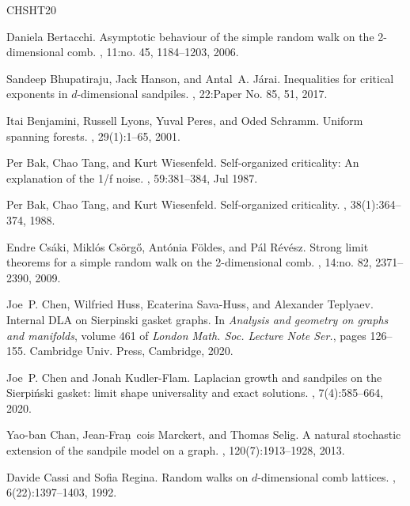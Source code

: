 \documentclass[11pt]{article}
\begin{document}
\begin{thebibliography}{CHSHT20}

Daniela Bertacchi.
\newblock Asymptotic behaviour of the simple random walk on the 2-dimensional comb.
, 11:no. 45, 1184--1203, 2006.

Sandeep Bhupatiraju, Jack Hanson, and Antal~A. J\'arai.
\newblock Inequalities for critical exponents in {$d$}-dimensional sandpiles.
, 22:Paper No. 85, 51, 2017.

Itai Benjamini, Russell Lyons, Yuval Peres, and Oded Schramm.
\newblock Uniform spanning forests.
, 29(1):1--65, 2001.

Per Bak, Chao Tang, and Kurt Wiesenfeld.
\newblock Self-organized criticality: An explanation of the 1/f noise.
, 59:381--384, Jul 1987.

Per Bak, Chao Tang, and Kurt Wiesenfeld.
\newblock Self-organized criticality.
, 38(1):364--374, 1988.

Endre Cs\'aki, Mikl\'os Cs\"org\H{o}, Ant\'onia F\"oldes, and P\'al R\'ev\'esz.
\newblock Strong limit theorems for a simple random walk on the 2-dimensional comb.
, 14:no. 82, 2371--2390, 2009.

Joe~P. Chen, Wilfried Huss, Ecaterina Sava-Huss, and Alexander Teplyaev.
\newblock Internal {DLA} on {S}ierpinski gasket graphs.
\newblock In {\em Analysis and geometry on graphs and manifolds}, volume 461 of {\em London Math. Soc. Lecture Note Ser.}, pages 126--155. Cambridge Univ. Press, Cambridge, 2020.

Joe~P. Chen and Jonah Kudler-Flam.
\newblock Laplacian growth and sandpiles on the {S}ierpi\'nski gasket: limit shape universality and exact solutions.
, 7(4):585--664, 2020.

Yao-ban Chan, Jean-Fran\c~cois Marckert, and Thomas Selig.
\newblock A natural stochastic extension of the sandpile model on a graph.
, 120(7):1913--1928, 2013.

Davide Cassi and Sofia Regina.
\newblock Random walks on {$d$}-dimensional comb lattices.
, 6(22):1397--1403, 1992.


\end{thebibliography}
\end{document}
